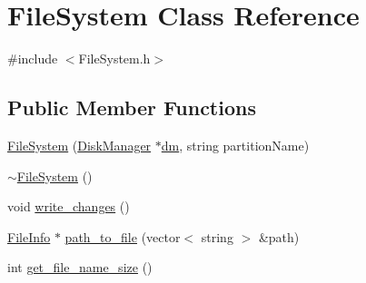 \hypertarget{class_file_system}{}\section{File\+System Class Reference}
\label{class_file_system}


{\ttfamily \#include $<$File\+System.\+h$>$}

\subsection*{Public Member Functions}
\begin{DoxyCompactItemize}
\item 
\mbox{\hyperlink{class_file_system_a1466c6d1e9636cecd44f0dd68ef710b5}{File\+System}} (\mbox{\hyperlink{class_disk_manager}{Disk\+Manager}} $\ast$\mbox{\hyperlink{daemon_8h_aa4c8f283fd621cbde00155b93e826d00}{dm}}, string partition\+Name)
\item 
\mbox{\hyperlink{class_file_system_a9e366f036e9d9cd884fa689963aacc49}{$\sim$\+File\+System}} ()
\item 
void \mbox{\hyperlink{class_file_system_a02953b33b71137de70b8c8e48c59ff77}{write\+\_\+changes}} ()
\item 
\mbox{\hyperlink{class_file_info}{File\+Info}} $\ast$ \mbox{\hyperlink{class_file_system_a6c6e95f60417b02601b72e951e7108f8}{path\+\_\+to\+\_\+file}} (vector$<$ string $>$ \&path)
\item 
int \mbox{\hyperlink{class_file_system_a0444400c1e30b7981123ba6991798c86}{get\+\_\+file\+\_\+name\+\_\+size}} ()
\end{DoxyCompactItemize}
